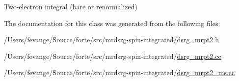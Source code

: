 Two-\/electron integral (bare or renormalized) 



The documentation for this class was generated from the following files\+:\begin{DoxyCompactItemize}
\item 
/\+Users/fevange/\+Source/forte/src/mrdsrg-\/spin-\/integrated/\mbox{\hyperlink{dsrg__mrpt2_8h}{dsrg\+\_\+mrpt2.\+h}}\item 
/\+Users/fevange/\+Source/forte/src/mrdsrg-\/spin-\/integrated/\mbox{\hyperlink{dsrg__mrpt2_8cc}{dsrg\+\_\+mrpt2.\+cc}}\item 
/\+Users/fevange/\+Source/forte/src/mrdsrg-\/spin-\/integrated/\mbox{\hyperlink{dsrg__mrpt2__ms_8cc}{dsrg\+\_\+mrpt2\+\_\+ms.\+cc}}\end{DoxyCompactItemize}
